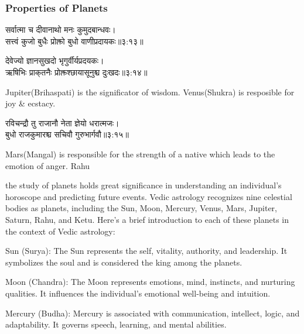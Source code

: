 \subsubsection{Properties of Planets}
\begin{sanskrit}
	\begin{center}
		सर्वात्मा च दीवानाथो मनः कुमुदबान्धवः।\\सत्त्वं कुजो बुधैः प्रोक्तो बुधो वाणीप्रदायकः॥३:१३॥\cite{BrihatParasharHoraShastraVol1, wiki:bphs}
	\end{center}
\end{sanskrit}
\begin{sanskrit}
	\begin{center}
		देवेज्यो ज्ञानसुखदो भृगुर्वीर्यप्रदयकः।\\ऋषिभिः प्राक्‌तनैः प्रोक्तश्छायासूनुश्च दुःखदः॥३:१४॥\cite{BrihatParasharHoraShastraVol1, wiki:bphs}
	\end{center}
\end{sanskrit}
Jupiter(Brihaspati) is the significator of wisdom. 
Venus(Shukra) is resposible for joy \& ecstacy.
\begin{sanskrit}
	\begin{center}
		रविचन्द्रौ तु राजानौ नेता ज्ञेयो धरात्मजः।\\बुधो राजकुमारश्च सचिवौ गुरुभार्गवौ॥३:१५॥\cite{BrihatParasharHoraShastraVol1, wiki:bphs}
	\end{center}
\end{sanskrit}
Mars(Mangal) is responsible for the strength of a native which leads to the emotion of anger.
Rahu

the study of planets holds great significance in understanding an individual's horoscope and predicting future events. Vedic astrology recognizes nine celestial bodies as planets, including the Sun, Moon, Mercury, Venus, Mars, Jupiter, Saturn, Rahu, and Ketu. Here's a brief introduction to each of these planets in the context of Vedic astrology:

Sun (Surya): The Sun represents the self, vitality, authority, and leadership. It symbolizes the soul and is considered the king among the planets.

Moon (Chandra): The Moon represents emotions, mind, instincts, and nurturing qualities. It influences the individual's emotional well-being and intuition.

Mercury (Budha): Mercury is associated with communication, intellect, logic, and adaptability. It governs speech, learning, and mental abilities.

